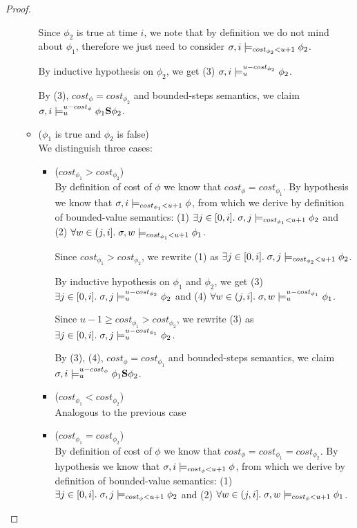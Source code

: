 \begin{theorem}
\begin{lemma}
\begin{proof}
\begin{itemize}
\begin{itemize}
        Since $\phi_2$ is true at time $i$, we note that by definition we do not mind about $\phi_1$, therefore we just need to consider $\sigma,i \models_{cost_{\phi_2} < u + 1} \phi_2$.

        By inductive hypothesis on $\phi_2$, we get (3) $\sigma,i \models_{u}^{u-cost_{\phi_2}} \phi_2$.

        By (3), $cost_\phi = cost_{\phi_2}$ and bounded-steps semantics, we claim $\sigma,i \models_{u}^{u-cost_\phi} \phi_1 \mathbf{S} \phi_2$.

        \item ($\phi_1$ is true and $\phi_2$ is false) \\
        We distinguish three cases:
        \begin{itemize}
            \item ($cost_{\phi_1} > cost_{\phi_2}$) \\
            By definition of cost of $\phi$ we know that $cost_\phi = cost_{\phi_1}$.
            By hypothesis we know that $\sigma, i \models_{cost_{\phi_1} < u + 1} \phi$, from which we derive by definition of bounded-value semantics: (1) $\exists j \in [0,i].\; \sigma,j \models_{cost_{\phi_1} < u + 1} \phi_2$ and (2) $\forall w \in (j,i].\; \sigma,w \models_{cost_{\phi_1} < u + 1} \phi_1$.

            Since $cost_{\phi_1} > cost_{\phi_2}$, we rewrite (1) as $\exists j \in [0,i].\; \sigma,j \models_{cost_{\phi_2} < u + 1} \phi_2$.

            By inductive hypothesis on $\phi_1$ and $\phi_2$, we get (3) $\exists j \in [0,i].\; \sigma,j \models_{u}^{u-cost_{\phi_2}} \phi_2$ and (4) $\forall w \in (j,i].\; \sigma,w \models_{u}^{u-cost_{\phi_1}} \phi_1$.

            Since $u-1 \geq cost_{\phi_1} > cost_{\phi_2}$, we rewrite (3) as $\exists j \in [0,i].\; \sigma,j \models_{u}^{u-cost_{\phi_1}} \phi_2$.

            By (3), (4), $cost_\phi = cost_{\phi_1}$ and bounded-steps semantics, we claim $\sigma,i \models_{u}^{u-cost_\phi} \phi_1 \mathbf{S} \phi_2$.

            \item ($cost_{\phi_1} < cost_{\phi_2}$) \\
            Analogous to the previous case

            \item ($cost_{\phi_1} = cost_{\phi_2}$) \\
            By definition of cost of $\phi$ we know that $cost_\phi = cost_{\phi_1} = cost_{\phi_2}$.
            By hypothesis we know that $\sigma, i \models_{cost_\phi < u + 1} \phi$, from which we derive by definition of bounded-value semantics: (1) $\exists j \in [0,i].\; \sigma,j \models_{cost_\phi < u + 1} \phi_2$ and (2) $\forall w \in (j,i].\; \sigma,w \models_{cost_\phi < u + 1} \phi_1$.


\end{itemize}
\end{itemize}
\end{itemize}
\end{proof}
\end{lemma}
\end{theorem}
